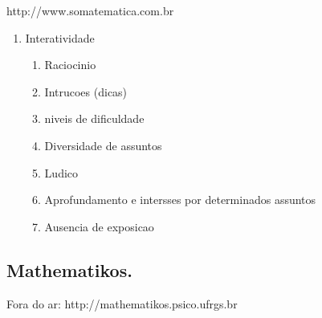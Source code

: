 \documentclass[a4paper,12pt]{article}
\begin{document}
http://www.somatematica.com.br

\begin{enumerate}
\item Interatividade
\begin{enumerate}
\item Raciocinio
\item Intrucoes (dicas)
\item niveis de dificuldade
\item Diversidade de assuntos
\item Ludico
\item Aprofundamento e intersses por determinados assuntos
\item Ausencia de exposicao
\end{enumerate}
\end{enumerate}

\subsection{Mathematikos.}
Fora do ar: http://mathematikos.psico.ufrgs.br
\end{document}
